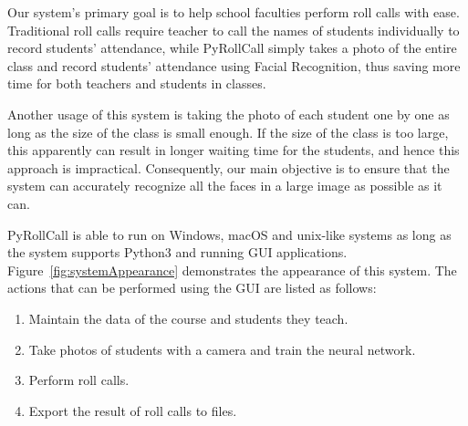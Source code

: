 Our system's primary goal is to help school faculties perform roll calls with ease.
Traditional roll calls require teacher to call the names of students individually to record students' attendance,
while PyRollCall simply takes a photo of the entire class and record students' attendance
using Facial Recognition, thus saving more time for both teachers and students in classes.
\vspace{0.5cm}

Another usage of this system is taking the photo of each student one by one as long as
the size of the class is small enough. If the size of the class is too large, this apparently
can result in longer waiting time for the students, and hence this approach is impractical.
Consequently, our main objective is to ensure that the system can accurately recognize all the faces
in a large image as possible as it can.
\vspace{0.5cm}

PyRollCall is able to run on Windows, macOS and unix-like systems as long as the system supports
Python3 and running GUI applications. Figure~\ref{fig:systemAppearance} demonstrates the appearance
of this system. The actions that can be performed using the GUI are listed as follows:
\vspace{0.2cm}

\begin{enumerate}
  \item Maintain the data of the course and students they teach.
  \item Take photos of students with a camera and train the neural network.
  \item Perform roll calls.
  \item Export the result of roll calls to files.
\end{enumerate}
\setstretch{\myContentLineSpacing}

